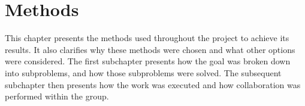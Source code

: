 \chapter{Methods}

This chapter presents the methods used throughout the project to achieve its results.
It also clarifies why these methods were chosen and what other options were considered.
The first subchapter presents how the goal was broken down into subproblems, and how those subproblems were solved.
The subsequent subchapter then presents how the work was executed and how collaboration was performed within the group.


